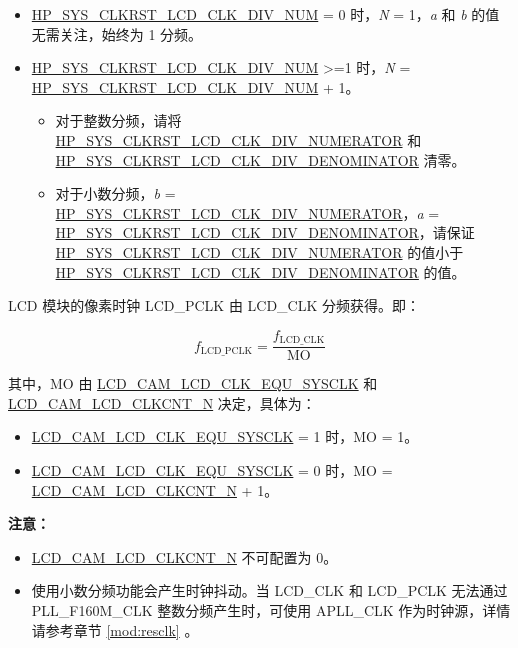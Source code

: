 \documentclass[main\_\_CN.tex]{subfiles}
\begin{document}
\begin{itemize}
    \item \hyperref[fielddesc:HPSYSCLKRSTLCDCLKDIVNUM]{HP\_SYS\_CLKRST\_LCD\_CLK\_DIV\_NUM} = 0 时，\textit{N} = 1，\textit{a} 和 \textit{b} 的值无需关注，始终为 1 分频。
    \item \hyperref[fielddesc:HPSYSCLKRSTLCDCLKDIVNUM]{HP\_SYS\_CLKRST\_LCD\_CLK\_DIV\_NUM} >=1 时，\textit{N} = \hyperref[fielddesc:HPSYSCLKRSTLCDCLKDIVNUM]{HP\_SYS\_CLKRST\_LCD\_CLK\_DIV\_NUM} + 1。
    \begin{itemize}
        \item 对于整数分频，请将 \hyperref[fielddesc:HPSYSCLKRSTLCDCLKDIVNUMERATOR]{HP\_SYS\_CLKRST\_LCD\_CLK\_DIV\_NUMERATOR} 和 \hyperref[fielddesc:HPSYSCLKRSTLCDCLKDIVDENOMINATOR]{HP\_SYS\_CLKRST\_LCD\_CLK\_DIV\_DENOMINATOR} 清零。
        \item 对于小数分频，\textit{b} = \hyperref[fielddesc:HPSYSCLKRSTLCDCLKDIVNUMERATOR]{HP\_SYS\_CLKRST\_LCD\_CLK\_DIV\_NUMERATOR}，\textit{a} = \hyperref[fielddesc:HPSYSCLKRSTLCDCLKDIVDENOMINATOR]{HP\_SYS\_CLKRST\_LCD\_CLK\_DIV\_DENOMINATOR}，请保证 \hyperref[fielddesc:HPSYSCLKRSTLCDCLKDIVNUMERATOR]{HP\_SYS\_CLKRST\_LCD\_CLK\_DIV\_NUMERATOR} 的值小于 \hyperref[fielddesc:HPSYSCLKRSTLCDCLKDIVDENOMINATOR]{HP\_SYS\_CLKRST\_LCD\_CLK\_DIV\_DENOMINATOR} 的值。
    \end{itemize}
\end{itemize}

LCD 模块的像素时钟 LCD\_PCLK 由 LCD\_CLK 分频获得。即：

$$f_{\textrm{LCD\_PCLK}} = \frac{f_{\textrm{LCD\_CLK}}}{\textrm{MO}}$$


其中，MO 由 \hyperref[fielddesc:LCDCAMLCDCLKEQUSYSCLK]{LCD\_CAM\_LCD\_CLK\_EQU\_SYSCLK} 和 \hyperref[fielddesc:LCDCAMLCDCLKCNTN]{LCD\_CAM\_LCD\_CLKCNT\_N} 决定，具体为：

\begin{itemize}
    \item \hyperref[fielddesc:LCDCAMLCDCLKEQUSYSCLK]{LCD\_CAM\_LCD\_CLK\_EQU\_SYSCLK} = 1 时，MO = 1。
    \item \hyperref[fielddesc:LCDCAMLCDCLKEQUSYSCLK]{LCD\_CAM\_LCD\_CLK\_EQU\_SYSCLK} = 0 时，MO = \hyperref[fielddesc:LCDCAMLCDCLKCNTN]{LCD\_CAM\_LCD\_CLKCNT\_N} + 1。
\end{itemize}

{\bfseries 注意：}
\begin{itemize}
    \item \hyperref[fielddesc:LCDCAMLCDCLKCNTN]{LCD\_CAM\_LCD\_CLKCNT\_N} 不可配置为 0。
    \item 使用小数分频功能会产生时钟抖动。当 LCD\_CLK 和 LCD\_PCLK 无法通过 PLL\_F160M\_CLK 整数分频产生时，可使用 APLL\_CLK 作为时钟源，详情请参考章节 \ref{mod:resclk} \textit{}。
\end{itemize}
\end{document}
